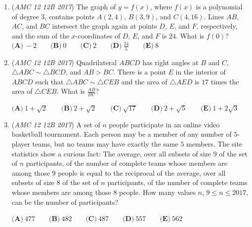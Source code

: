 \begin{enumerate}
 $\textbf{(A)}\ \frac{7}{576} \qquad \textbf{(B)}\ \frac{5}{192} \qquad \textbf{(C)}\ \frac{1}{36} \qquad \textbf{(D)}\ \frac{5}{144} \qquad\textbf{(E)}\ \frac{7}{48}$


	\item (\textit{AMC 12 12B 2017}) The graph of $y=f(x)$, where $f(x)$ is a polynomial of degree $3$, contains points $A(2,4)$, $B(3,9)$, and $C(4,16)$. Lines $AB$, $AC$, and $BC$ intersect the graph again at points $D$, $E$, and $F$, respectively, and the sum of the $x$-coordinates of $D$, $E$, and $F$ is $24$. What is $f(0)$?
$\textbf{(A)}\ -2 \qquad \textbf{(B)}\ 0 \qquad \textbf{(C)}\ 2 \qquad \textbf{(D)}\ \frac{24}{5} \qquad\textbf{(E)}\ 8$


	\item (\textit{AMC 12 12B 2017}) Quadrilateral $ABCD$ has right angles at $B$ and $C$, $\triangle ABC \sim \triangle BCD$, and $AB > BC$. There is a point $E$ in the interior of $ABCD$ such that $\triangle ABC \sim \triangle CEB$ and the area of $\triangle AED$ is $17$ times the area of $\triangle CEB$. What is $\frac{AB}{BC}$?


 $\textbf{(A)}\ 1 + \sqrt{2} \qquad \textbf{(B)}\ 2 + \sqrt{2} \qquad \textbf{(C)}\ \sqrt{17} \qquad \textbf{(D)}\ 2 + \sqrt{5} \qquad\textbf{(E)}\ 1 + 2\sqrt{3}$


	\item (\textit{AMC 12 12B 2017}) A set of $n$ people participate in an online video basketball tournament. Each person may be a member of any number of $5$-player teams, but no teams may have exactly the same $5$ members. The site statistics show a curious fact: The average, over all subsets of size $9$ of the set of $n$ participants, of the number of complete teams whose members are among those 9 people is equal to the reciprocal of the average, over all subsets of size $8$ of the set of $n$ participants, of the number of complete teams whose members are among those $8$ people. How many values $n$, $9 \leq n \leq 2017$, can be the number of participants?


 $\textbf{(A)}\ 477 \qquad \textbf{(B)}\ 482 \qquad \textbf{(C)}\ 487 \qquad \textbf{(D)}\ 557 \qquad\textbf{(E)}\ 562$


\end{enumerate}